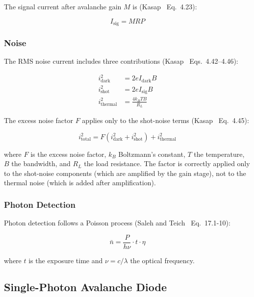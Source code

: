 \documentclass[11pt,a4paper]{article}
\begin{document}
The signal current after avalanche gain $M$ is
(Kasap~\cite{kasap} Eq.~4.23):

\begin{equation}
  I_{\text{sig}} = M R P
  \label{eq:signal-current}
\end{equation}

\subsubsection{Noise}

The RMS noise current includes three contributions
(Kasap~\cite{kasap} Eqs.~4.42--4.46):

\begin{align}
  i_{\text{dark}}^2 &= 2e I_{\text{dark}} B \\
  i_{\text{shot}}^2 &= 2e I_{\text{sig}} B \\
  i_{\text{thermal}}^2 &= \frac{4k_B T B}{R_L}
\end{align}

The excess noise factor $F$ applies only to the shot-noise terms
(Kasap~\cite{kasap} Eq.~4.45):

\begin{equation}
  i_{\text{total}}^2 = F(i_{\text{dark}}^2 + i_{\text{shot}}^2)
                      + i_{\text{thermal}}^2
  \label{eq:apd-noise}
\end{equation}

where $F$ is the excess noise factor, $k_B$ Boltzmann's constant,
$T$ the temperature, $B$ the bandwidth, and $R_L$ the load resistance.
The factor is correctly applied only to the shot-noise components
(which are amplified by the gain stage), not to the thermal noise
(which is added after amplification).

\subsubsection{Photon Detection}

Photon detection follows a Poisson process (Saleh and
Teich~\cite{saleh} Eq.~17.1-10):

\begin{equation}
  \bar{n} = \frac{P}{h\nu} \cdot t \cdot \eta
\end{equation}

where $t$ is the exposure time and $\nu = c/\lambda$ the optical frequency.

\subsection{Single-Photon Avalanche Diode}
\end{document}
